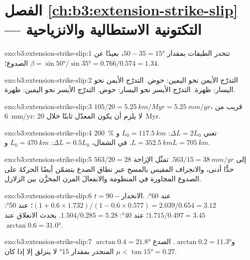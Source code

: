 \section*{الفصل \ref{ch:b3:extension-strike-slip} --- التكتونية الاستطالية والانزياحية}

\begin{solution}{exo:b3:extension-strike-slip:1}
تنحدر الطبقات بمقدار $50 - 35 = \ang{15}$، بعيدًا عن الصدوع؛ $\beta =
\sin\ang{50}/\sin\ang{35} = 0.766/0.574 = 1.34$.
\end{solution}

\begin{solution}{exo:b3:extension-strike-slip:2}
التدرّج الأيمن نحو اليمين: حوض. التدرّج الأيمن نحو اليسار: ظهرة. التدرّج الأيسر
نحو اليسار: حوض. التدرّج الأيسر نحو اليمين: ظهرة.
\end{solution}

\begin{solution}{exo:b3:extension-strike-slip:3}
$105/20 = \qty{5.25}{km/Myr} = \qty{5.25}{mm/yr}$، قريب من
\qty{6}{mm/yr}: لا يلزم أن يكون المعدّل ثابتًا خلال \qty{20}{Myr}.
\end{solution}

\begin{solution}{exo:b3:extension-strike-slip:4}
\qty{200}{\percent} تعني $\Delta L = 2L_0$: $L_0 = \qty{117.5}{km}$ و$L
= \qty{352.5}{km}$. في الشمال، $\Delta L = 0.5L_0$: $L_0 = \qty{470}{km}$
و$L = \qty{705}{km}$.
\end{solution}

\begin{solution}{exo:b3:extension-strike-slip:5}
$563/20 = 28$ إلى $563/15 = \qty{38}{mm/yr}$. تمثّل الإزاحة حدًّا أدنى، والانجراف المقيس بالمسح عبر نطاق الصدع يتضمّن أيضًا
الحركةَ على الصدوع المجاورة في المنظومة
والانفعالَ المرن المخزَّن
بين الزلازل.
\end{solution}

\begin{solution}{exo:b3:extension-strike-slip:6}
$t = 90 - \text{الانحدار}$. عند \ang{60}: $(1 + 0.6\times1.732)/(1 - 0.6\times
0.577) = 2.039/0.654 = 3.12$؛ عند \ang{50}: $1.715/0.497 = 3.45$؛ عند
\ang{40}: $1.504/0.285 = 5.28$. يحدث الانغلاق عند $\arctan0.6 = \ang{31.0}$.
\end{solution}

\begin{solution}{exo:b3:extension-strike-slip:7}
$\arctan0.4 = \ang{21.8}$ و$\arctan0.2 = \ang{11.3}$. الصدع المنحدر
بمقدار \ang{15} لا ينزلق إلا إذا كان $\mu < \tan\ang{15} = 0.27$.
\end{solution}

